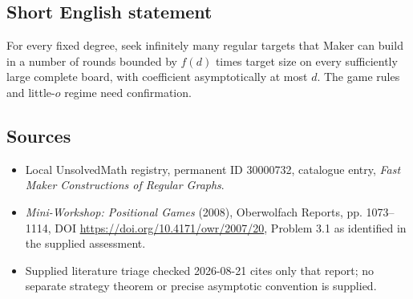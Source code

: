 \documentclass[11pt]{article}
\begin{document}
\subsection{Short English statement}
For every fixed degree, seek infinitely many regular targets that Maker can build in a number of rounds bounded by \(f(d)\) times target size on every sufficiently large complete board, with coefficient asymptotically at most \(d\). The game rules and little-\(o\) regime need confirmation.
\subsection{Sources}
\begin{itemize}
\item Local UnsolvedMath registry, permanent ID 30000732, catalogue entry, \emph{Fast Maker Constructions of Regular Graphs}.
\item \emph{Mini-Workshop: Positional Games} (2008), Oberwolfach Reports, pp. 1073--1114, DOI \url{https://doi.org/10.4171/owr/2007/20}, Problem 3.1 as identified in the supplied assessment.
\item Supplied literature triage checked 2026-08-21 cites only that report; no separate strategy theorem or precise asymptotic convention is supplied.
\end{itemize}
\end{document}
